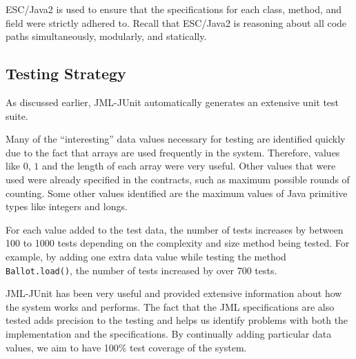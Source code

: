 \documentclass[letterpaper,twocolumn,10pt]{article}
\begin{document}
ESC/Java2 is used to ensure that the specifications for each class,
method, and field were strictly adhered to.  Recall that ESC/Java2 is
reasoning about all code paths simultaneously, modularly, and
statically.


\subsection{Testing Strategy}

As discussed earlier, JML-JUnit automatically generates an extensive
unit test suite.

Many of the ``interesting'' data values necessary for testing are
identified quickly due to the fact that arrays are used frequently in
the system.  Therefore, values like $0$, $1$ and the length of each
array were very useful.  Other values that were used were already
specified in the contracts, such as maximum possible rounds of
counting.  Some other values identified are the maximum values of
Java primitive types like integers and longs.

For each value added to the test data, the number of tests increases
by between 100 to 1000 tests depending on the complexity and size
method being tested.  For example, by adding one extra data value
while testing the method \texttt{Ballot.load()}, the number of tests
increased by over 700 tests.

JML-JUnit has been very useful and provided extensive information
about how the system works and performs.  The fact that the JML
specifications are also tested adds precision to the testing and helps
us identify problems with both the implementation and the
specifications.  By continually adding particular data values, we aim
to have 100\% test coverage of the system.   
\end{document}
